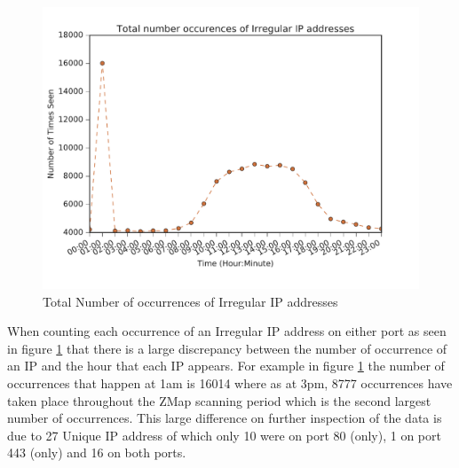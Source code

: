 \documentclass[a4wide,leqno,12pt]{report}
\begin{document}
\begin{figure}[H]
\centering
\includegraphics[scale=.5]{pdf_images/TotalNumberOccurencesOfIrregularIPaddressesOnAverage}
\caption{Total Number of occurrences of Irregular IP addresses }
\label{fig:irreg_occurence}
\end{figure}
When counting each occurrence of an Irregular IP address on either port as seen in figure \ref{fig:irreg_occurence} that there is a large discrepancy between the number of occurrence of an IP and the hour that each IP appears. For example in figure \ref{fig:irreg_occurence} the number of occurrences that happen at 1am is 16014 where as at 3pm, 8777 occurrences have taken place throughout the ZMap scanning period which is the second largest number of occurrences. This large difference on further inspection of the data is due to 27 Unique IP address of which only 10 were on port 80 (only), 1 on port 443 (only) and 16 on both ports.\\



\begin{table}[H]
\centering
{}
\caption{Top 10 Irregular IP addresses seen at 1am}
\label{table:2}
\end{table}
\end{document}
